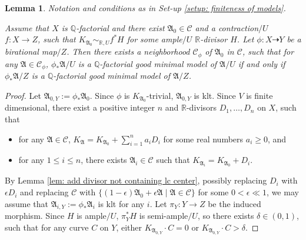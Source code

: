 \documentclass[12pt]{amsart}
\numberwithin{equation}{section}
\newcommand{\Rr}{\mathbb{R}}
\newcommand{\Aa}{{\mathfrak{A}}}
\newtheorem{lem}[thm]{Lemma}
\theoremstyle{definition}
\theoremstyle{definition}
\theoremstyle{definition}
\begin{document}
\begin{lem}\label{lem: relative good minimal model neighborhood is good minimal model}
Notation and conditions as in Set-up \ref{setup: finiteness of models}.

Assume that $X$ is $\mathbb Q$-factorial and there exist $\Aa_0\in\mathcal{C}$ and a contraction$/U$ $f: X\rightarrow Z$, such that $K_{\Aa_0}\sim_{\mathbb R,U}f^*H$ for some ample$/U$ $\Rr$-divisor $H$. Let $\phi: X\dashrightarrow Y$ be a birational map$/Z$. Then there exists a neighborhood $\mathcal{C}_{\phi}$ of $\Aa_0$ in $\mathcal{C}$, such that for any $\Aa\in\mathcal{C}_{\phi}$, $\phi_*\Aa/U$ is a $\mathbb Q$-factorial good minimal model of $\Aa/U$ if and only if $\phi_*\Aa/Z$ is a $\mathbb Q$-factorial good minimal model of $\Aa/Z$. 
\end{lem}
\begin{proof}
Let $\Aa_{0,Y}:=\phi_*\Aa_0$. Since $\phi$ is $K_{\Aa_0}$-trivial, $\Aa_{0,Y}$ is klt. Since $V$ is finite dimensional, there exist a positive integer $n$ and $\Rr$-divisors $D_1,\dots,D_n$ on $X$, such that
\begin{itemize}
    \item for any $\Aa\in\mathcal{C}$, $K_{\Aa}=K_{\Aa_0}+\sum_{i=1}^n a_iD_i$ for some real numbers $a_i\geq 0$, and
    \item for any $1\leq i\leq n$, there exists $\Aa_i\in\mathcal{C}$ such that $K_{\Aa_i}=K_{\Aa_0}+D_i$.
\end{itemize}
By Lemma \ref{lem: add divisor not containing lc center}, possibly replacing $D_i$ with $\epsilon D_i$ and replacing $\mathcal{C}$ with $\{(1-\epsilon)\Aa_0+\epsilon\Aa\mid\Aa\in\mathcal{C}\}$ for some $0<\epsilon\ll 1$, we may assume that $\Aa_{i,Y}:=\phi_*\Aa_i$ is klt for any $i$. Let $\pi_Y: Y\rightarrow Z$ be the induced morphism. Since $H$ is ample$/U$, $\pi_Y^*H$ is semi-ample$/U$, so there exists $\delta\in (0,1)$, such that for any curve $C$ on $Y$, either $K_{\Aa_{0,Y}}\cdot C=0$ or $K_{\Aa_{0,Y}}\cdot C>\delta$.


\end{proof}
\end{document}

